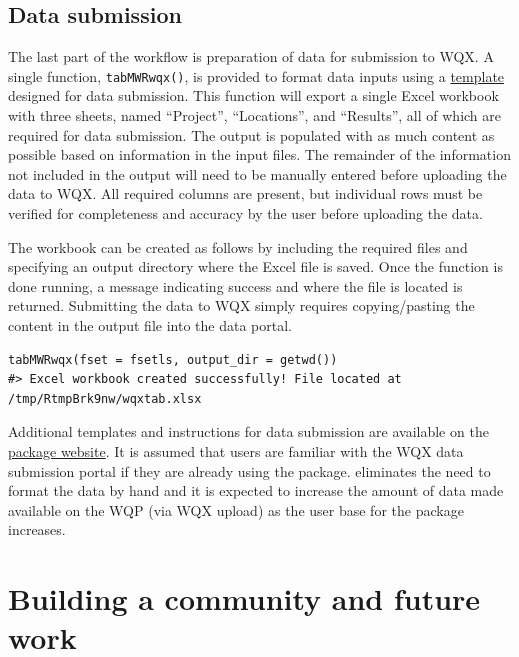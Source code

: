 \hypertarget{data-submission}{%
\subsection{Data submission}\label{data-submission}}

The last part of the  workflow is preparation of data for submission to WQX. A single function, \texttt{tabMWRwqx()}, is provided to format data inputs using a \href{https://massbays-tech.github.io/MassWateR/RESOURCES.html}{template} designed for data submission. This function will export a single Excel workbook with three sheets, named ``Project'', ``Locations'', and ``Results'', all of which are required for data submission. The output is populated with as much content as possible based on information in the input files. The remainder of the information not included in the output will need to be manually entered before uploading the data to WQX. All required columns are present, but individual rows must be verified for completeness and accuracy by the user before uploading the data.

The workbook can be created as follows by including the required files and specifying an output directory where the Excel file is saved. Once the function is done running, a message indicating success and where the file is located is returned. Submitting the data to WQX simply requires copying/pasting the content in the output file into the data portal.

\begin{verbatim}
tabMWRwqx(fset = fsetls, output_dir = getwd())
#> Excel workbook created successfully! File located at /tmp/RtmpBrk9nw/wqxtab.xlsx
\end{verbatim}

Additional templates and instructions for data submission are available on the \href{https://massbays-tech.github.io/MassWateR/index.html}{package website}. It is assumed that users are familiar with the WQX data submission portal if they are already using the package.  eliminates the need to format the data by hand and it is expected to increase the amount of data made available on the WQP (via WQX upload) as the user base for the package increases.

\hypertarget{building-a-community-and-future-work}{%
\section{Building a community and future work}\label{building-a-community-and-future-work}}

